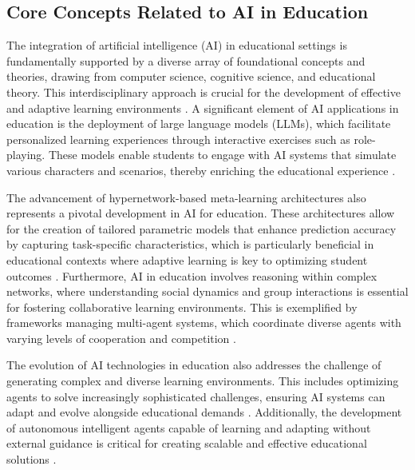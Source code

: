 \subsection{Core Concepts Related to AI in Education} \label{subsec:Core Concepts Related to AI in Education}



The integration of artificial intelligence (AI) in educational settings is fundamentally supported by a diverse array of foundational concepts and theories, drawing from computer science, cognitive science, and educational theory. This interdisciplinary approach is crucial for the development of effective and adaptive learning environments \cite{korre2023takesvillagemultidisciplinaritycollaboration}. A significant element of AI applications in education is the deployment of large language models (LLMs), which facilitate personalized learning experiences through interactive exercises such as role-playing. These models enable students to engage with AI systems that simulate various characters and scenarios, thereby enriching the educational experience \cite{tao2024rolecraftglmadvancingpersonalizedroleplaying}.



The advancement of hypernetwork-based meta-learning architectures also represents a pivotal development in AI for education. These architectures allow for the creation of tailored parametric models that enhance prediction accuracy by capturing task-specific characteristics, which is particularly beneficial in educational contexts where adaptive learning is key to optimizing student outcomes \cite{stank2024designingtimeseriesmodelshypernetworks}. Furthermore, AI in education involves reasoning within complex networks, where understanding social dynamics and group interactions is essential for fostering collaborative learning environments. This is exemplified by frameworks managing multi-agent systems, which coordinate diverse agents with varying levels of cooperation and competition \cite{chen2024adaptivenetworkinterventioncomplex}.



The evolution of AI technologies in education also addresses the challenge of generating complex and diverse learning environments. This includes optimizing agents to solve increasingly sophisticated challenges, ensuring AI systems can adapt and evolve alongside educational demands \cite{wang2019pairedopenendedtrailblazerpoet}. Additionally, the development of autonomous intelligent agents capable of learning and adapting without external guidance is critical for creating scalable and effective educational solutions \cite{le2019evolvingselfsupervisedneuralnetworks}. 



